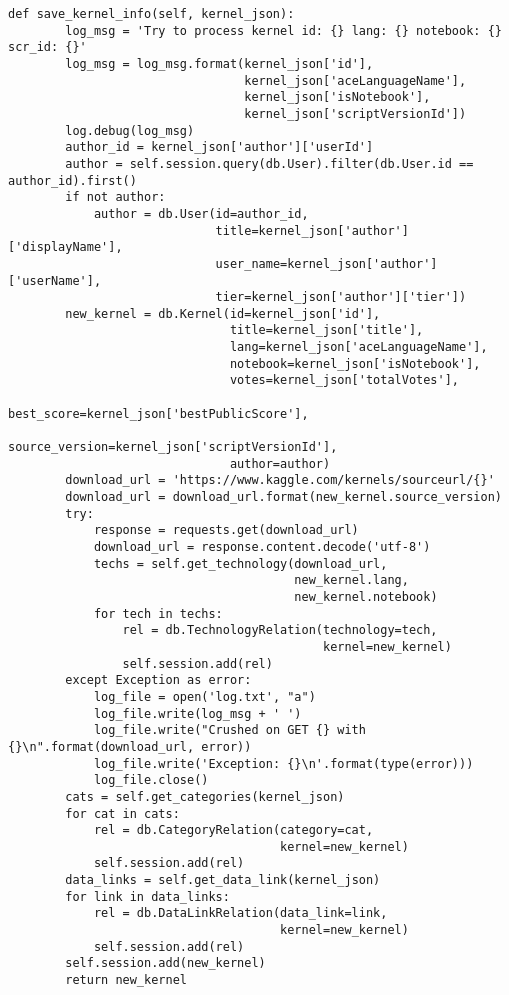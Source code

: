 \begin{lstlisting}[style=app]
    def save_kernel_info(self, kernel_json):
        log_msg = 'Try to process kernel id: {} lang: {} notebook: {} scr_id: {}'
        log_msg = log_msg.format(kernel_json['id'],
                                 kernel_json['aceLanguageName'],
                                 kernel_json['isNotebook'],
                                 kernel_json['scriptVersionId'])
        log.debug(log_msg)
        author_id = kernel_json['author']['userId']
        author = self.session.query(db.User).filter(db.User.id == author_id).first()
        if not author:
            author = db.User(id=author_id,
                             title=kernel_json['author']['displayName'],
                             user_name=kernel_json['author']['userName'],
                             tier=kernel_json['author']['tier'])
        new_kernel = db.Kernel(id=kernel_json['id'],
                               title=kernel_json['title'],
                               lang=kernel_json['aceLanguageName'],
                               notebook=kernel_json['isNotebook'],
                               votes=kernel_json['totalVotes'],
                               best_score=kernel_json['bestPublicScore'],
                               source_version=kernel_json['scriptVersionId'],
                               author=author)
        download_url = 'https://www.kaggle.com/kernels/sourceurl/{}'
        download_url = download_url.format(new_kernel.source_version)
        try:
            response = requests.get(download_url)
            download_url = response.content.decode('utf-8')
            techs = self.get_technology(download_url,
                                        new_kernel.lang,
                                        new_kernel.notebook)
            for tech in techs:
                rel = db.TechnologyRelation(technology=tech,
                                            kernel=new_kernel)
                self.session.add(rel)
        except Exception as error:
            log_file = open('log.txt', "a")
            log_file.write(log_msg + ' ')
            log_file.write("Crushed on GET {} with {}\n".format(download_url, error))
            log_file.write('Exception: {}\n'.format(type(error)))
            log_file.close()
        cats = self.get_categories(kernel_json)
        for cat in cats:
            rel = db.CategoryRelation(category=cat,
                                      kernel=new_kernel)
            self.session.add(rel)
        data_links = self.get_data_link(kernel_json)
        for link in data_links:
            rel = db.DataLinkRelation(data_link=link,
                                      kernel=new_kernel)
            self.session.add(rel)
        self.session.add(new_kernel)
        return new_kernel


\end{lstlisting}
